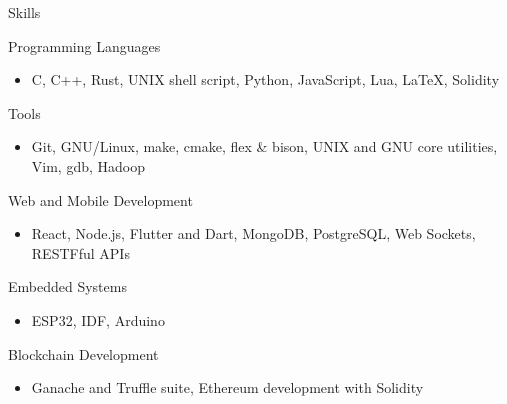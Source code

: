 \documentclass{article}
\newlength{\tabin}
\newlength{\secsep}
\newcommand{\lineunder}{\vspace*{-8pt} \\ \hspace*{-6pt} \hrulefill \\ \vspace*{-15pt}}
\newenvironment{tabbedsection}[1]{
	\begin{list}{}{
		\setlength{\itemsep}{0pt}
		\setlength{\labelsep}{0pt}
		\setlength{\labelwidth}{0pt}
		\setlength{\leftmargin}{\tabin}
		\setlength{\rightmargin}{\tabin}
		\setlength{\listparindent}{0pt}
		\setlength{\parsep}{0pt}
		\setlength{\parskip}{0pt}
		\setlength{\partopsep}{0pt}
		\setlength{\topsep}{#1}
	}
	\item[]
}{\end{list}}
\newenvironment{resume_section}[1]{
	\vspace{2\secsep}
	\textsc{\large#1}
	\lineunder
	\begin{tabbedsection}{\secsep}
}{\end{tabbedsection}}
\newenvironment{resume_subsection}[2][]{
	\textbf{#2} \hfill {\footnotesize #1} \hspace{2em}
	\begin{tabbedsection}{0.5\secsep}
}{\end{tabbedsection}}
\newenvironment{subitems}{
	\renewcommand{\labelitemi}{-}
	\begin{itemize}
		\setlength{\labelsep}{1em}
}{\end{itemize}}
\begin{document}
\begin{resume_section}{Skills}

	\begin{resume_subsection}{Programming Languages}
		\begin{subitems}
		\item C, C++, Rust, UNIX shell script, Python, JavaScript, Lua, {\LaTeX}, Solidity
		\end{subitems}
	\end{resume_subsection}

	\begin{resume_subsection}{Tools}
		\begin{subitems}
		\item Git, GNU/Linux, make, cmake, flex \& bison, UNIX and GNU core utilities, Vim, gdb, Hadoop
		\end{subitems}
	\end{resume_subsection}

	\begin{resume_subsection}{Web and Mobile Development}
		\begin{subitems}
		\item React, Node.js, Flutter and Dart, MongoDB, PostgreSQL, Web Sockets, RESTFful APIs
		\end{subitems}
	\end{resume_subsection}

	\begin{resume_subsection}{Embedded Systems}
		\begin{subitems}
		\item ESP32, IDF, Arduino
		\end{subitems}
	\end{resume_subsection}

	\begin{resume_subsection}{Blockchain Development}
		\begin{subitems}
		\item Ganache and Truffle suite, Ethereum development with Solidity
		\end{subitems}
	\end{resume_subsection}

\end{resume_section}
\end{document}
